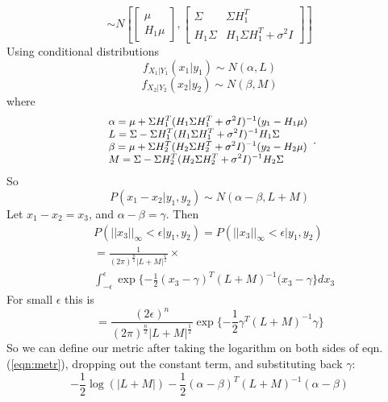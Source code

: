 \documentclass{article}
\begin{document}
\begin{equation}
 \sim N \left[\begin{bmatrix} \mu \\ H_1 \mu \end{bmatrix}, \begin{bmatrix} \Sigma & \Sigma H_1^T \\ H_1 \Sigma & H_1 \Sigma H_1^T + \sigma^2 I \end{bmatrix} \right]
\end{equation}
\noindent
Using conditional distributions
 \begin{equation}
  f_{X_1|Y_1}(x_1|y_1) \sim N(\alpha, L)
 \end{equation}
\begin{equation}
  f_{X_2|Y_2}(x_2|y_2) \sim N(\beta, M)
 \end{equation}
where 
\begin{equation}
\small{
\begin{array}{l}\alpha = \mu + \Sigma H_1^T (H_1 \Sigma H_1^T + \sigma^2 I)^{-1} (y_1 - H_1 \mu) \\ L = \Sigma - \Sigma H_1^T (H_1 \Sigma H_1^T + \sigma^2 I)^{-1} H_1 \Sigma \\ \beta = \mu + \Sigma H_2^T (H_2 \Sigma H_2^T + \sigma^2 I)^{-1} (y_2 - H_2 \mu) \\ M = \Sigma - \Sigma H_2^T (H_2 \Sigma H_2^T + \sigma^2 I)^{-1} H_2 \Sigma        \end{array}}   .
\end{equation}
So
\begin{equation}
P(x_1 - x_2|y_1, y_2) \sim N(\alpha-\beta, L+M)
\end{equation}
Let $x_1 - x_2 = x_3$, and $\alpha -\beta=\gamma$. Then
\begin{align}
&P(||x_3||_{\infty} < \epsilon|y_1,y_2)   \nonumber
										 =	 P(||x_3||_{\infty} < \epsilon|y_1,y_2)\\ \nonumber
										&=   \frac{1}{(2 \pi)^{\frac{n}{2}} |L+M|^ \frac{1}{2}} \times \\ 
										& \int_{-\epsilon }^{\epsilon}\exp \{ -\frac{1}{2}(x_3 - \gamma)^T(L+M)^{-1}(x_3 - \gamma\}dx_3 
\end{align}
For small $\epsilon$ this is
\begin{equation}
= \frac{(2 \epsilon)^n}{(2 \pi)^{\frac{n}{2}} |L + M|^{\frac{1}{2}}} \exp\{-\frac{1}{2}\gamma^T(L+M)^{-1}\gamma\} 
\label{eqn:metr}
\end{equation}
So we can define our metric after taking the logarithm on both sides of eqn.(\ref{eqn:metr}), dropping out the constant term, and substituting back $\gamma$:
\begin{equation}\label{eq:mah_eqn}
 -\frac{1}{2}\log(|L + M|) -\frac{1}{2}(\alpha - \beta)^T(L+M)^{-1}(\alpha -\beta)
\end{equation}
\end{document}
